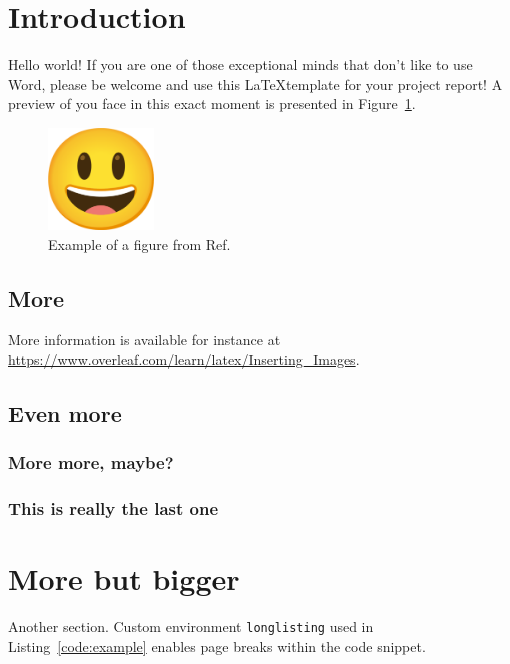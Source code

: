 \section{Introduction}

Hello world! If you are one of those exceptional minds that don't like to use Word, please be welcome and use this \LaTeX template for your project report! A preview of you face in this exact moment is presented in Figure~\ref{fig:example}.

\begin{figure}[h]
    \centering
    \includegraphics[width=0.25\textwidth]{assets/example.png}
    \caption{Example of a figure from Ref.~\cite{exampleCitation}}
    \label{fig:example}
\end{figure}

\lipsum[1]

\subsection{More}
More information is available for instance at \url{https://www.overleaf.com/learn/latex/Inserting_Images}.

\subsection{Even more}

\lipsum[2]

\subsubsection{More more, maybe?}

\lipsum[3-4]


\subsubsection{This is really the last one}

\lipsum[5]





\section{More but bigger}
Another section.
\ifprintCode
Custom environment \texttt{longlisting} used in Listing~\ref{code:example} enables page breaks within the code snippet.

